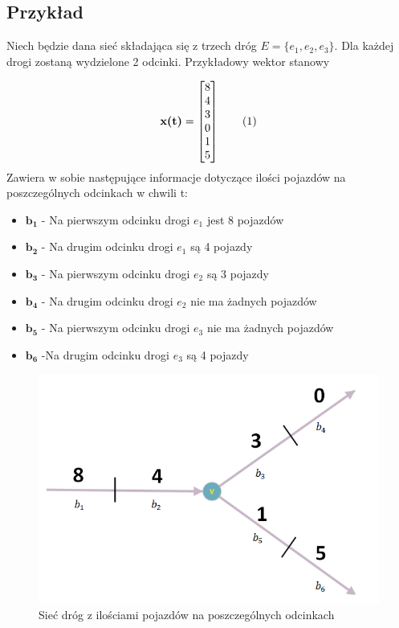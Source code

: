 \documentclass[12pt]{book}
\theoremstyle{plain}
\newcommand\addtag{\refstepcounter{equation}
\renewcommand{\labelenumii}{\theenumii}
\renewcommand{\theenumii}{\theenumi.\arabic{enumii}.}
\tag{\theequation}}
\begin{document}
\subsection{Przykład} \label{subsec:wektor_stanowy_siec_przyklad}
Niech będzie dana sieć składająca się z trzech dróg $E=\{e_1,e_2,e_3\}$. Dla każdej drogi zostaną wydzielone 2 odcinki. Przykładowy wektor stanowy
\def \xzero {\begin{bmatrix}
		8 \\ 4 \\ 3 \\ 0 \\ 1 \\ 5
\end{bmatrix}}

\[\textbf{x(t)}=\xzero \addtag \]
Zawiera w sobie następujące informacje dotyczące ilości pojazdów na poszczególnych odcinkach w chwili t:
\begin{itemize}
	\item $\boldsymbol{b_1}$ - Na pierwszym odcinku drogi $e_1$ jest 8 pojazdów
	\item $\boldsymbol{b_2}$ - Na drugim odcinku drogi $e_1$ są 4 pojazdy 
	\item $\boldsymbol{b_3}$ - Na pierwszym odcinku drogi $e_2$ są 3 pojazdy 
	\item $\boldsymbol{b_4}$ - Na drugim odcinku drogi $e_2$ nie ma żadnych pojazdów 
	\item $\boldsymbol{b_5}$ - Na pierwszym odcinku drogi $e_3$ nie ma żadnych pojazdów 
	\item $\boldsymbol{b_6}$ -Na drugim odcinku drogi $e_3$ są 4 pojazdy
\end{itemize}

\begin{figure}[H]
	\centering
	\includegraphics[width=14cm]{3_single_road}
	\caption{Sieć dróg z ilościami pojazdów na poszczególnych odcinkach}
	\label{fig:3_single_road}
\end{figure}
\end{document}

